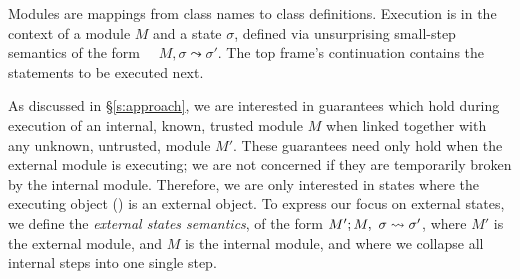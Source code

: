  Modules are mappings
from class names to class definitions. 
Execution 
is in the context of  a module $M$ and   a state $\sigma$,
 defined via unsurprising small-step semantics of the form \ \ 
   $M, \sigma \leadsto \sigma'$.
The   top frame's continuation contains the statements to be %
executed next.
 
As discussed in \S \ref{s:approach}, we are interested in guarantees which hold
during execution of an internal, 
known, trusted module $M$ when linked together with any
unknown, untrusted, module $M'$. These guarantees need only hold 
when the external module is executing; we are not concerned if they are
temporarily broken by the internal module. Therefore, we are only interested in states where the
executing object (\prg{this}) is an external object. 
To express our focus on external states, we define the  \emph{external states semantics}, of the form 
$M' ; M,\ \sigma \leadsto \sigma'$, where $M'$ is the external
module, and $M$ is the internal module, and where we
collapse all internal steps into one single step.

 

